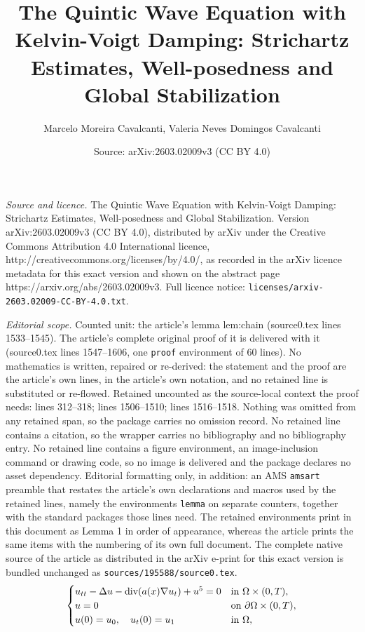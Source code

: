 \documentclass[10pt,a4paper]{amsart}
\title{The Quintic Wave Equation with Kelvin-Voigt Damping: Strichartz Estimates, Well-posedness and Global Stabilization}
\author{Marcelo Moreira Cavalcanti, Valeria Neves Domingos Cavalcanti}
\date{Source: arXiv:2603.02009v3 (CC BY 4.0)}
\begin{document}
\maketitle

\noindent\emph{Source and licence.} The Quintic Wave Equation with Kelvin-Voigt Damping: Strichartz Estimates, Well-posedness and Global Stabilization. Version arXiv:2603.02009v3 (CC BY 4.0), distributed by arXiv under the Creative Commons Attribution 4.0 International licence, http://creativecommons.org/licenses/by/4.0/, as recorded in the arXiv licence metadata for this exact version and shown on the abstract page https://arxiv.org/abs/2603.02009v3. Full licence notice: \texttt{licenses/arxiv-2603.02009-CC-BY-4.0.txt}.\par\smallskip

\noindent\textit{Editorial scope.} Counted unit: the article's lemma lem:chain (source0.tex lines 1533--1545). The article's complete original proof of it is delivered with it (source0.tex lines 1547--1606, one \texttt{proof} environment of 60 lines). No mathematics is written, repaired or re-derived: the statement and the proof are the article's own lines, in the article's own notation, and no retained line is substituted or re-flowed.  Retained uncounted as the source-local context the proof needs: lines 312--318; lines 1506--1510; lines 1516--1518.  Nothing was omitted from any retained span, so the package carries no omission record.  No retained line contains a citation, so the wrapper carries no bibliography and no bibliography entry.  No retained line contains a figure environment, an image-inclusion command or drawing code, so no image is delivered and the package declares no asset dependency.  Editorial formatting only, in addition: an AMS \texttt{amsart} preamble that restates the article's own declarations and macros used by the retained lines, namely the environments \texttt{lemma} on separate counters, together with the standard packages those lines need.  The retained environments print in this document as Lemma 1 in order of appearance, whereas the article prints the same items with the numbering of its own full document.  The complete native source of the article as distributed in the arXiv e-print for this exact version is bundled unchanged as \texttt{sources/195588/source0.tex}.
\begin{equation}\label{eq:main}
\begin{cases}
u_{tt} - \Delta u - \hbox{div}(a(x) \nabla u_t) + u^5 = 0 & \text{in } \Omega \times (0,T), \\
u = 0 & \text{on } \partial \Omega \times (0,T), \\
u(0) = u_0, \quad u_t(0) = u_1 & \text{in } \Omega,
\end{cases}
\end{equation}
\end{document}
